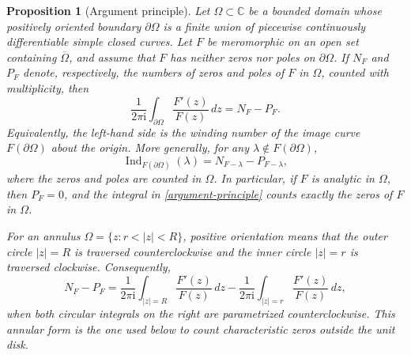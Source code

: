 \documentclass[11pt,a4paper]{article}
\newtheorem{prop}[thm]{Proposition}
\theoremstyle{definition}
\begin{document}
\begin{prop}[Argument principle]\label{prop:argument-principle}\cite{rudin1987real}
	Let $\Omega\subset\mathbb{C}$ be a bounded domain whose positively oriented boundary $\partial\Omega$ is a finite union of piecewise continuously differentiable simple closed curves. Let $F$ be meromorphic on an open set containing $\overline{\Omega}$, and assume that $F$ has neither zeros nor poles on $\partial\Omega$. If $N_F$ and $P_F$ denote, respectively, the numbers of zeros and poles of $F$ in $\Omega$, counted with multiplicity, then
	\begin{equation}
		\frac{1}{2\pi\mathrm{i}}\int_{\partial\Omega}
		\frac{F'(z)}{F(z)}\,dz=N_F-P_F.
		\label{argument-principle}
	\end{equation}
	Equivalently, the left-hand side is the winding number of the image curve $F(\partial\Omega)$ about the origin. More generally, for any $\lambda\notin F(\partial\Omega)$,
	\begin{equation*}
		\operatorname{Ind}_{F(\partial\Omega)}(\lambda)
		= N_{F-\lambda}-P_{F-\lambda},
	\end{equation*}
	where the zeros and poles are counted in $\Omega$. In particular, if $F$ is analytic in $\Omega$, then $P_F=0$, and the integral in \eqref{argument-principle} counts exactly the zeros of $F$ in $\Omega$.

	For an annulus $\Omega=\{z:r<|z|<R\}$, positive orientation means that the outer circle $|z|=R$ is traversed counterclockwise and the inner circle $|z|=r$ is traversed clockwise. Consequently,
	\begin{equation*}
		N_F-P_F
		=\frac{1}{2\pi\mathrm{i}}\int_{|z|=R}\frac{F'(z)}{F(z)}\,dz
		-\frac{1}{2\pi\mathrm{i}}\int_{|z|=r}\frac{F'(z)}{F(z)}\,dz,
	\end{equation*}
	when both circular integrals on the right are parametrized counterclockwise. This annular form is the one used below to count characteristic zeros outside the unit disk.
\end{prop}
\end{document}
